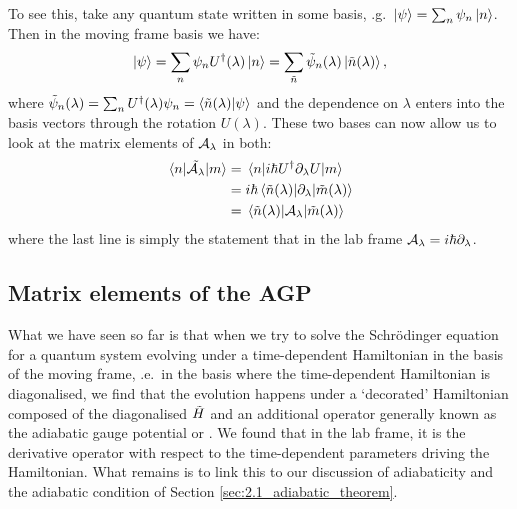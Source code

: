     To see this, take any quantum state written in some basis, \@e.g.~$\ket{\psi} = \sum_n \psi_n \ket{n}$. Then in the moving frame basis we have:
    \begin{equation}\label{eq:AGP_basis_change}
            \ket{\psi} = \sum_n \psi_n U^{\dagger}(\lambda) \ket{n} = \sum_{\Tilde{n}} \Tilde{\psi}_n (\lambda) \ket*{\Tilde{n}(\lambda)},
    \end{equation}
    where $\Tilde{\psi}_n (\lambda) = \sum_n U^{\dagger}(\lambda) \psi_n = \braket{\Tilde{n}(\lambda)}{\psi}$ and the dependence on $\lambda$ enters into the basis vectors through the rotation $U(\lambda)$. These two bases can now allow us to look at the matrix elements of $\mathcal{A}_{\lambda}$ in both:
    \begin{equation}\label{eq:AGP_as_derivative}
        \begin{aligned}
            \mel{n}{\Tilde{\mathcal{A}_{\lambda}}}{m} &= \mel{n}{i\hbar U^{\dagger}\partial_{\lambda}U}{m} \\
            &= i\hbar \mel{\Tilde{n}(\lambda)}{\partial_{\lambda}}{\Tilde{m}(\lambda)} \\
            &= \mel{\Tilde{n}(\lambda)}{\mathcal{A}_{\lambda}}{\Tilde{m}(\lambda)}
        \end{aligned}
    \end{equation}
    where the last line is simply the statement that in the lab frame $\mathcal{A}_{\lambda} = i\hbar \partial_{\lambda}$.

    \subsection{Matrix elements of the AGP}

    What we have seen so far is that when we try to solve the Schr\"{o}dinger equation for a quantum system evolving under a time-dependent Hamiltonian in the basis of the moving frame, \@i.e.~in the basis where the time-dependent Hamiltonian is diagonalised, we find that the evolution happens under a `decorated' Hamiltonian composed of the diagonalised $\Tilde{H}$ and an additional operator generally known as the adiabatic gauge potential or . We found that in the lab frame, it is the derivative operator with respect to the time-dependent parameters driving the Hamiltonian. What remains is to link this to our discussion of adiabaticity and the adiabatic condition of Section \ref{sec:2.1_adiabatic_theorem}.

